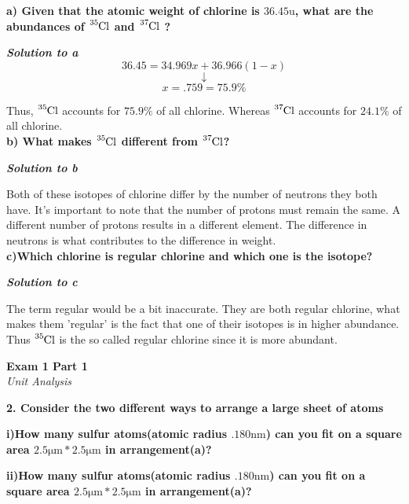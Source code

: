 \documentclass{article}
\begin{document}
    \textbf{a) Given that the atomic weight of chlorine is $36.45 \si{\atomicmassunit}$, what are the abundances of $\ce{^{35}Cl}$ and $\ce{^{37}Cl}$ ?}

    \textbf{\textit{Solution to a}}
    $$36.45 = 34.969x + 36.966(1 - x)$$
    $$\downarrow$$
    $$x = .759 = 75.9 \%$$

    Thus, $\ce{^{35}Cl}$ accounts for $75.9 \%$ of all chlorine. Whereas $\ce{^{37}Cl}$ accounts for $24.1 \%$ of all chlorine.\\[1cm]

    \textbf{b) What makes $\ce{^{35}Cl}$ different from $\ce{^{37}Cl}$?}

    \textbf{\textit{Solution to b}}

    Both of these isotopes of chlorine differ by the number of neutrons they both have. It's important to note that the number of protons must remain the same. A different number of protons results in a different element. The difference in neutrons is what contributes to the difference in weight.\\[1cm]

    \textbf{c)Which chlorine is regular chlorine and which one is the isotope?}

    \textbf{\textit{Solution to c}}

    The term regular would be a bit inaccurate. They are both regular chlorine, what makes them 'regular' is the fact that one of their isotopes is in higher abundance. Thus $\ce{^{35}Cl}$ is the so called regular chlorine since it is more abundant.
    \pagebreak

    \begin{center}
        \textbf{Exam 1 Part 1}\\
        \textit{Unit Analysis}
    \end{center}
    \textbf{2. Consider the two different ways to arrange a large sheet of atoms}

    \textbf{i)How many sulfur atoms(atomic radius $.180 \si{\nano\metre}$) can you fit on a square area $2.5 \si{\micro\metre} * 2.5 \si{\micro\metre}$ in arrangement(a)?}

    \textbf{ii)How many sulfur atoms(atomic radius $.180 \si{\nano\metre}$) can you fit on a square area $2.5 \si{\micro\metre} * 2.5 \si{\micro\metre}$ in arrangement(a)?}
\end{document}

